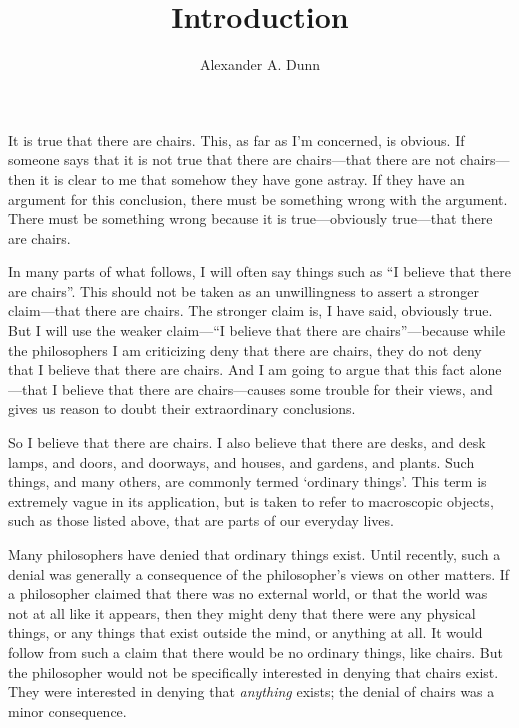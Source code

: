 \documentclass[11pt]{article}
\title{Introduction}
\author{Alexander A. Dunn}
\begin{document}
\ifstandalone
\maketitle
\begin{spacing}{1.5}
\fi

It is true that there are chairs.  This, as far as I'm concerned, is
obvious.  If someone says that it is not true that there are
chairs---that there are not chairs---then it is clear to me that
somehow they have gone astray.  If they have an argument for this
conclusion, there must be something wrong with the argument.  There
must be something wrong because it is true---obviously true---that
there are chairs.

In many parts of what follows, I will often say things such as ``I
believe that there are chairs''.  This should not be taken as an
unwillingness to assert a stronger claim---that there are chairs.  The
stronger claim is, I have said, obviously true.  But I will use the
weaker claim---``I believe that there are chairs''---because while the
philosophers I am criticizing deny that there are chairs, they do not
deny that I believe that there are chairs.  And I am going to argue
that this fact alone---that I believe that there are chairs---causes
some trouble for their views, and gives us reason to doubt their
extraordinary conclusions.

So I believe that there are chairs.  I also believe that there are
desks, and desk lamps, and doors, and doorways, and houses, and
gardens, and plants.  Such things, and many others, are commonly
termed `ordinary things'.  This term is extremely vague in its
application, but is taken to refer to macroscopic objects, such as
those listed above, that are parts of our everyday lives.

Many philosophers have denied that ordinary things exist.  Until
recently, such a denial was generally a consequence of the
philosopher's views on other matters.  If a philosopher claimed that
there was no external world, or that the world was not at all like it
appears, then they might deny that there were any physical things, or
any things that exist outside the mind, or anything at all.  It would
follow from such a claim that there would be no ordinary things, like
chairs.  But the philosopher would not be specifically interested in
denying that chairs exist.  They were interested in denying that {\em
  anything} exists; the denial of chairs was a minor consequence.


\end{spacing}
\end{document}
